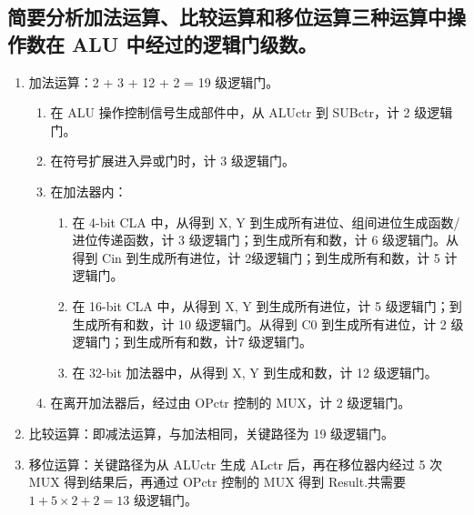 \documentclass{article}
\begin{document}
    \subsection{简要分析加法运算、比较运算和移位运算三种运算中操作数在 ALU 中经过的逻辑门级数。}
    \begin{enumerate}
        \item 加法运算：2 + 3 + 12 + 2 = 19 级逻辑门。

    \begin{enumerate}
        \item 在 ALU 操作控制信号生成部件中，从 ALUctr 到 SUBctr，计 2 级逻辑门。
        \\
        \item 在符号扩展进入异或门时，计 3 级逻辑门。
        \item 在加法器内：
        \begin{enumerate}
        \item 在 4-bit CLA 中，从得到 X, Y 到生成所有进位、组间进位生成函数/进位传递函数，计 3 级逻辑门；到生成所有和数，计 6 级逻辑门。从得到 Cin 到生成所有进位，计 2级逻辑门；到生成所有和数，计 5 计逻辑门。
        \item 在 16-bit CLA 中，从得到 X, Y 到生成所有进位，计 5 级逻辑门；到生成所有和数，计 10 级逻辑门。从得到 C0 到生成所有进位，计 2 级逻辑门；到生成所有和数，计7 级逻辑门。
        \item 在 32-bit 加法器中，从得到 X, Y 到生成和数，计 12 级逻辑门。
        \end{enumerate}
        
        \item 在离开加法器后，经过由 OPctr 控制的 MUX，计 2 级逻辑门。

    \end{enumerate}
    \item 比较运算：即减法运算，与加法相同，关键路径为 19 级逻辑门。
    \item 移位运算：关键路径为从 ALUctr 生成 ALctr 后，再在移位器内经过 5 次 MUX 得到结果后，再通过 OPctr 控制的 MUX 得到 Result.共需要 $1 + 5 × 2 + 2 = 13$ 级逻辑门。


    \end{enumerate}
\end{document}
